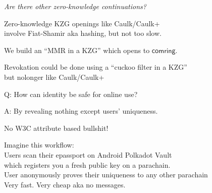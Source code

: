 \documentclass{beamer}
\def\comring{\ensuremath{\mathsf{comring}}\xspace}
\begin{document}
\begin{frame} %

\hspace{30pt} {\it Are there other zero-knowledge continuations?}

\bigskip\bigskip

Zero-knowledge KZG openings like Caulk/Caulk+ \\ \smallskip
\hspace{10pt} involve Fiat-Shamir aka hashing, but not too slow.  \\

\bigskip

We build an ``MMR in a KZG'' which opens to $\comring$.


\pause\bigskip\bigskip\bigskip

Revokation could be done using a ``cuckoo filter in a KZG'' \\
\hspace{10pt} but nolonger like Caulk/Caulk+

\end{frame}



\begin{frame} %
	
Q: How can identity be safe for online use?

\bigskip

A: By revealing nothing except users' uniqueness.

\bigskip\bigskip

\hspace{10pt} No W3C attribute based bullshit!

\end{frame}



\begin{frame} %

Imagine this workflow: \\ \medskip
\hspace{5pt} Users scan their epassport on Android Polkadot Vault \\
\hspace{10pt} which registers you a fresh public key on a parachain. \\ \medskip
\hspace{5pt} User anonymously proves their uniqueness to any other parachain \\
\hspace{10pt} Very fast.  Very cheap aka no messages.  \\

\end{frame}
\end{document}
